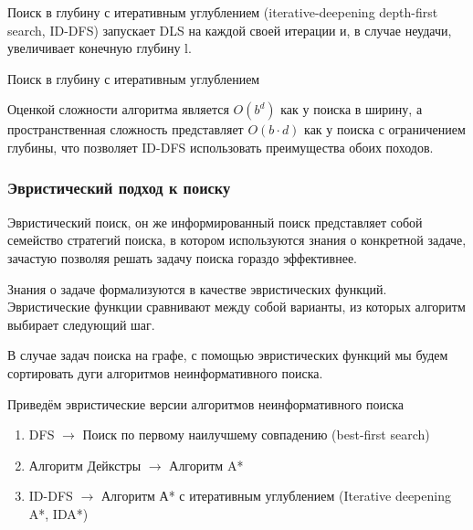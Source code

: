 Поиск в глубину с итеративным углублением (iterative-deepening depth-first search, ID-DFS) запускает DLS на каждой своей итерации и, в случае неудачи, увеличивает конечную глубину l.

\begin{algorithm}[H]
\SetAlgoLined
{}

\caption{Поиск в глубину с итеративным углублением}
\label{algo:ID-DFS}
\end{algorithm}

Оценкой сложности алгоритма является $O(b^d)$ как у поиска в ширину, а пространственная сложность представляет $O(b \cdot d)$ как у поиска с ограничением глубины, что позволяет ID-DFS использовать преимущества обоих походов.

\subsubsection{Эвристический подход к поиску}

Эвристический поиск, он же информированный поиск представляет собой семейство стратегий поиска,
в котором используются знания о конкретной задаче, зачастую позволяя решать задачу поиска гораздо эффективнее.

Знания о задаче формализуются в качестве эвристических функций.
Эвристические функции сравнивают между собой варианты, из которых алгоритм выбирает следующий шаг.

В случае задач поиска на графе, с помощью эвристических функций мы будем сортировать дуги алгоритмов неинформативного поиска.

Приведём эвристические версии алгоритмов неинформативного поиска
\begin{enumerate}
    \item DFS $\rightarrow$ Поиск по первому наилучшему совпадению (best-first search)
    \item Алгоритм Дейкстры $\rightarrow$ Алгоритм A*
    \item ID-DFS $\rightarrow$ Алгоритм А* с итеративным углублением (Iterative deepening A*, IDA*)
\end{enumerate}


